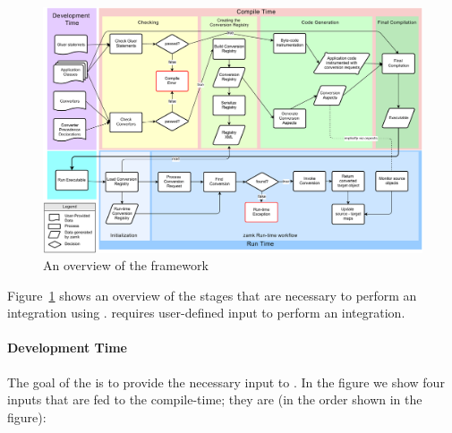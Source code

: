 \begin{figure}
\includegraphics[height=\textwidth, angle=90]{chapteradapters/bigpicture.pdf}
\caption{An overview of the \zamk framework}
\label{fig:framework}
\end{figure}

Figure~\ref{fig:framework} shows an overview of the stages that are necessary to perform an integration using \zamk.
\zamk requires user-defined input to perform an integration.

\paragraph{Development Time}
The goal of the  is to provide the necessary input to \zamk. 
In the figure we show four inputs that are fed to the \zamk compile-time; they are (in the order shown in the figure):

